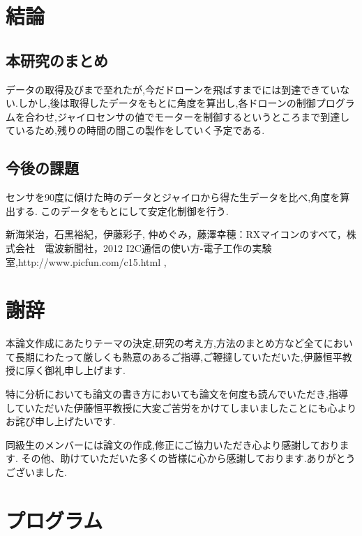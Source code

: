 \documentclass[12pt,oneside]{paper}
\begin{document}
\chapter{結論}
\section{本研究のまとめ}データの取得及びまで至れたが,今だドローンを飛ばすまでには到達できていない.しかし,後は取得したデータをもとに角度を算出し,各ドローンの制御プログラムを合わせ,ジャイロセンサの値でモーターを制御するというところまで到達しているため,残りの時間の間この製作をしていく予定である.

\section{今後の課題}
センサを90度に傾けた時のデータとジャイロから得た生データを比べ,角度を算出する.
このデータをもとにして安定化制御を行う.


\begin{thebibliography}{8}
 新海栄治，石黒裕紀，伊藤彩子, 仲めぐみ，藤澤幸穂：RXマイコンのすべて，株式会社　電波新聞社，2012
 I2C通信の使い方-電子工作の実験室,http://www.picfun.com/c15.html , 
\end{thebibliography}

\chapter*{謝辞}
本論文作成にあたりテーマの決定,研究の考え方,方法のまとめ方など全てにおいて長期にわたって厳しくも熱意のあるご指導,ご鞭撻していただいた,伊藤恒平教授に厚く御礼申し上げます.


特に分析においても論文の書き方においても論文を何度も読んでいただき,指導していただいた伊藤恒平教授に大変ご苦労をかけてしまいましたことにも心よりお詫び申し上げたいです.


同級生のメンバーには論文の作成,修正にご協力いただき心より感謝しております.
その他、助けていただいた多くの皆様に心から感謝しております.ありがとうございました.

\appendix
\chapter{プログラム}




%



\end{document}
